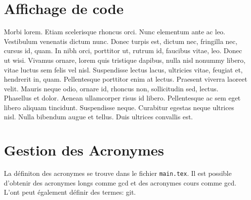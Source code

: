 \section{Affichage de code}



Morbi lorem. Etiam scelerisque rhoncus orci. Nunc elementum ante ac leo. Vestibulum venenatis dictum nunc. Donec turpis est, dictum nec, fringilla nec, cursus id, quam. In nibh orci, porttitor ut, rutrum id, faucibus vitae, leo. Donec ut wisi. Vivamus ornare, lorem quis tristique dapibus, nulla nisl nonummy libero, vitae luctus sem felis vel nisl. Suspendisse lectus lacus, ultricies vitae, feugiat et, hendrerit in, quam. Pellentesque porttitor enim at lectus. Praesent viverra laoreet velit. Mauris neque odio, ornare id, rhoncus non, sollicitudin sed, lectus. Phasellus et dolor. Aenean ullamcorper risus id libero. Pellentesque ac sem eget libero aliquam tincidunt. Suspendisse neque. Curabitur egestas neque ultrices nisl. Nulla bibendum augue et tellus. Duis ultrices convallis est.


\section{Gestion des Acronymes}

La définiton des acronymes se trouve dans le fichier \texttt{main.tex}. Il est possible 
d'obtenir des acronymes longs comme \acrlong{gcd} et des acronymes cours comme \acrshort{gcd}. \\
L'ont peut également définir des termes: \gls{git}.

